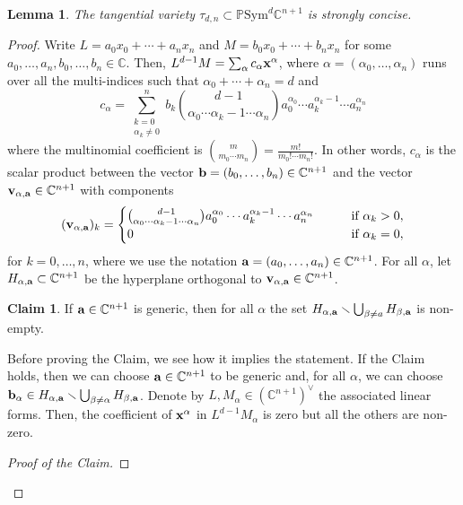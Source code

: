 \documentclass{amsart}
\theoremstyle{plain}
\numberwithin{theorem}{section}
\newtheorem{lemma}[theorem]{Lemma}
\theoremstyle{definition}
\newtheorem*{claim}{Claim}
\newcommand{\bbC}{\mathbb{C}}
\newcommand{\bbP}{\mathbb{P}}
\newcommand{\Sym}{\mathrm{Sym}}
\begin{document}
\begin{lemma}
\label{lem:tangential}
    The tangential variety $\tau_{d,n} \subset \bbP \Sym^d\bbC^{n+1}$ is strongly concise.
\end{lemma}
\begin{proof}
    Write $L = a_0x_0+\cdots + a_nx_n$ and $M = b_0x_0 + \cdots + b_nx_n$ for some $a_0,\ldots,a_n,b_0,\ldots,b_n \in \bbC$. Then, $L^{d-1} M = \sum_{\alpha} c_\alpha {\bf x}^{\alpha}$, where $\alpha = (\alpha_0,\ldots,\alpha_n)$ runs over all the multi-indices such that $\alpha_0+\cdots+\alpha_n = d$ and
    \[
        c_\alpha = \sum_{\substack{k = 0 \\ \alpha_k \neq 0}}^n b_k \binom{d-1}{\alpha_0 \cdots \alpha_{k} -1 \cdots \alpha_n}a_0^{\alpha_0} \cdots a_k^{\alpha_k -1} \cdots a_n^{\alpha_n}
    \]
    where the multinomial coefficient is $\binom{m}{m_0\cdots m_n} = \frac{m!}{m_0! \cdots m_n!}$. In other words, $c_\alpha$ is the scalar product between the vector ${\bf b} = (b_0,\ldots,b_n) \in \bbC^{n+1}$ and the vector ${\bf v}_{\alpha, {\bf a}} \in \bbC^{n+1}$ with components
    \[
        ({\bf v}_{\alpha,{\bf a}})_k = \begin{cases}
            \binom{d-1}{\alpha_0 \cdots \alpha_{k} -1 \cdots \alpha_n}a_0^{\alpha_0} \cdots a_k^{\alpha_k -1} \cdots a_n^{\alpha_n} \qquad & \text{if } \alpha_k >0, \\
            0 & \text{if } \alpha_k = 0,
        \end{cases}
    \]
    for $k = 0,\ldots, n$, where we use the notation ${\bf a} = (a_0,\ldots,a_n) \in \bbC^{n+1}$. For all $\alpha$, let $H_{\alpha, {\bf a}} \subset \bbC^{n+1}$ be the hyperplane orthogonal to ${\bf v}_{\alpha,{\bf a}} \in \bbC^{n+1}$.
    \begin{claim}
        If ${\bf a} \in \bbC^{n+1}$ is generic, then for all $\alpha$ the set $H_{\alpha,{\bf a}} \smallsetminus \bigcup_{\beta \neq a} H_{\beta, {\bf a}}$ is non-empty.
    \end{claim}
    Before proving the Claim, we see how it implies the statement. If the Claim holds, then we can choose ${\bf a} \in \bbC^{n+1}$ to be generic and, for all $\alpha$, we can choose ${\bf b}_{\alpha} \in H_{\alpha,{\bf a}} \smallsetminus \bigcup_{\beta \neq \alpha} H_{\beta, {\bf a}}$. Denote by $L, M_{\alpha} \in (\bbC^{n+1})^\vee$ the associated linear forms. Then, the coefficient of ${\bf x}^\alpha$ in $L^{d-1}M_\alpha$ is zero but all the others are non-zero.
    \begin{proof}[Proof of the Claim]

\end{proof}
\end{proof}
\end{document}
